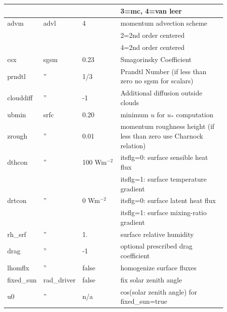 \documentclass[11pt,a4paper]{article}
\begin{document}
\begin{longtable}[htb]{p{0.12\linewidth}p{0.1\linewidth}p{0.18\linewidth}p{0.5\linewidth}}
             &      &                     & \hspace{2mm} 3=mc, 4=van leer                         \\
\hline
advm         & advl & 4                   & momentum advection scheme                             \\ 
             &      &                     & \hspace{2mm} 2=2nd order centered                     \\
             &      &                     & \hspace{2mm} 4=2nd order centered                     \\
\hline
csx          & sgsm & 0.23                & Smagorinsky Coefficient                               \\
prndtl       &  ''  & 1/3                 & Prandtl Number (if less than zero no sgsm for scalars) \\
clouddiff    &  ''  & -1                  & Additional diffusion outside clouds                   \\
\hline
ubmin        & srfc & 0.20                & minimum $u$ for $u_*$ computation                     \\
zrough       &  ''  & 0.01                & momentum roughness height (if less than zero use Charnock relation) \\
dthcon       &  ''  & 100 Wm$^{-2}$       & itsflg=0: surface sensible heat flux                  \\
             &      &                     & itsflg=1: surface temperature gradient                \\
drtcon       &  ''  & 0   Wm$^{-2}$       & itsflg=0: surface latent heat flux                    \\
             &      &                     & itsflg=1: surface mixing-ratio gradient               \\
rh\_srf      &  ''  & 1.                  & surface relative humidity                             \\ 
drag         &  ''  & -1                  & optional prescribed drag coefficient                  \\
lhomflx      &  ''  & false               & homogenize surface fluxes                             \\ 
\hline
fixed\_sun   &rad\_driver& false          & fix solar zenith angle                                \\
u0           &  ''  & n/a                 & cos(solar zenith angle) for fixed\_sun=true           \\

\end{longtable}
\end{document}
